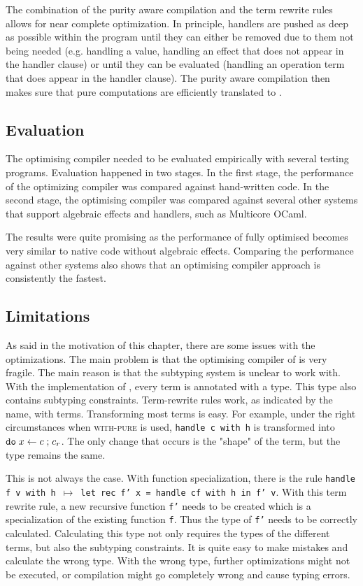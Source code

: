 The combination of the purity aware compilation and the term rewrite rules allows for near complete optimization. In principle, handlers are pushed as deep as possible within the program until they can either be removed due to them not being needed (e.g. handling a value, handling an effect that does not appear in the handler clause) or until they can be evaluated (handling an operation term that does appear in the handler clause). The purity aware compilation then makes sure that pure computations are efficiently translated to \ocaml.

\subsection{Evaluation}\label{loop}
The optimising compiler needed to be evaluated empirically with several testing programs. Evaluation happened in two stages. In the first stage, the performance of the optimizing compiler was compared against hand-written \ocaml code. In the second stage, the optimising compiler was compared against several other systems that support algebraic effects and handlers, such as Multicore OCaml.

The results were quite promising as the performance of fully optimised \eff becomes very similar to native code without algebraic effects. Comparing the performance against other systems also shows that an optimising compiler approach is consistently the fastest. 

\subsection{Limitations}\label{problems-eff}
As said in the motivation of this chapter, there are some issues with the optimizations. The main problem is that the optimising compiler of \eff is very fragile. The main reason is that the subtyping system is unclear to work with. With the implementation of \eff, every term is annotated with a type. This type also contains subtyping constraints. Term-rewrite rules work, as indicated by the name, with terms. Transforming most terms is easy. For example, under the right circumstances when \textsc{with-pure} is used, \texttt{handle c with h} is transformed into $\mathtt{do}\; x \leftarrow c \;\mathtt{ ; }\; c_r$. The only change that occurs is the "shape" of the term, but the type remains the same.

This is not always the case. With function specialization, there is the rule \texttt{handle f v with h $\mapsto$ let rec f' x = handle cf with h in f' v}. With this term rewrite rule, a new recursive function \texttt{f'} needs to be created which is a specialization of the existing function \texttt{f}. Thus the type of \texttt{f'} needs to be correctly calculated. Calculating this type not only requires the types of the different terms, but also the subtyping constraints. It is quite easy to make mistakes and calculate the wrong type. With the wrong type, further optimizations might not be executed, or compilation might go completely wrong and cause typing errors. 

